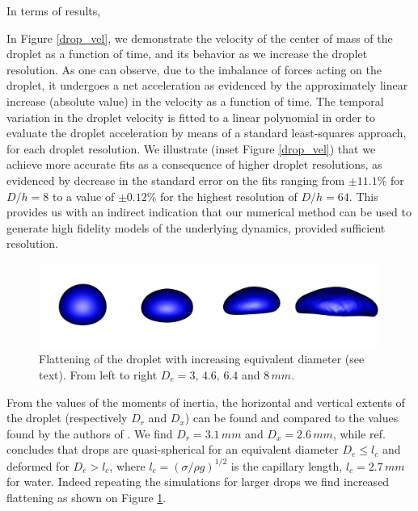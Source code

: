 In terms of results, 

\vspace*{0.2cm}

In Figure \ref{drop_vel}, we demonstrate the velocity of the center of mass of the droplet as a function of time, and its behavior as we increase the droplet resolution. As one can observe, due to the imbalance of forces acting on the droplet, it undergoes a net acceleration as evidenced by the approximately linear increase (absolute value) in the velocity as a function of time. The temporal variation in the droplet velocity is fitted to a linear polynomial in order to evaluate the droplet acceleration by means of a standard least-squares approach, for each droplet resolution. We illustrate (inset Figure \ref{drop_vel}) that we achieve more accurate fits as a consequence of higher droplet resolutions, as evidenced by decrease in the standard error on the fits ranging from $\pm 11.1 \%$ for $D/h = 8$ to a value of $\pm 0.12 \%$ for the highest resolution of $D/h = 64$. This provides us with an indirect indication that our numerical method can be used to generate high fidelity models of the underlying dynamics, provided sufficient resolution.           




\begin{figure}
\begin{center}
\includegraphics[width=0.99\textwidth]{Figures/flatten.png}
\end{center}
\caption{Flattening of the droplet with increasing equivalent diameter 
(see text). From left to right $D_e=3, \,4.6,\, 6.4$ and $8\, mm$.}
\label{flatten}
\end{figure}
From the values of the moments of inertia, the horizontal and vertical 
extents of the droplet (respectively $D_r$ and $D_x$) can be found 
and compared to the values found by the authors of \cite{Reyssat:2007ko}. 
We find $D_r=3.1 \,mm$ and $D_x=2.6 \,mm$, while ref. \cite{Reyssat:2007ko} 
concludes that drops are quasi-spherical for an equivalent diameter 
$D_e \le l_c$ and deformed for $D_e > l_c$, where $l_c =(\sigma/\rho g)^{1/2}$ 
is the capillary length, $l_c = 2.7 \,mm$ for water. 
Indeed repeating the simulations for larger drops we find increased 
flattening as shown on Figure \ref{flatten}. 
%

